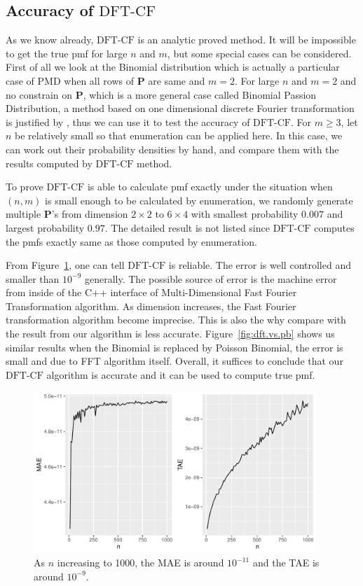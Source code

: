 \documentclass[12pt]{article}
\newcommand{\Pmat}{\mathbf{P}}
\newcommand{\PMD}{\textrm{PMD}}
\newcommand{\dft}{{\textrm{DFT-CF}}}
\begin{document}
\subsection{Accuracy of $\dft$}
As we know already, $\dft$ is an analytic proved method. It will be impossible to get the true pmf for large $n$ and $m$, but some special cases can be considered. First of all we look at the Binomial distribution which is actually a particular case of $\PMD$ when all rows of $\Pmat$ are same and $m=2$. For large $n$ and $m=2$ and no constrain on $\Pmat$, which is a more general case called Binomial Passion Distribution, a method based on one dimensional discrete Fourier transformation is justified by , thus we can use it to test the accuracy of $\dft$. For $m \geq 3$, let $n$ be relatively small so that enumeration can be applied here. In this case, we can work out their probability densities by hand, and compare them with the results computed by $\dft$ method.

To prove $\dft$ is able to calculate pmf exactly under the situation when $(n,m)$ is small enough to be calculated by enumeration, we randomly generate multiple $\Pmat$'s from dimension $2 \times 2$ to $6 \times 4$ with smallest probability $0.007$ and largest probability $0.97$. The detailed result is not listed since $\dft$ computes the pmfs exactly same as those computed by enumeration.

From Figure~\ref{fig:mae.tae}, one can tell $\dft$ is reliable. The error is well controlled and smaller than $10^{-9}$ generally. The possible source of error is the machine error from inside of the C++ interface of Multi-Dimensional Fast Fourier Transformation algorithm. As dimension increases, the Fast Fourier transformation algorithm become imprecise. This is also the why compare with the result from  our algorithm is less accurate. Figure~\ref{fig:dft.vs.pb} shows us similar results when the Binomial is replaced by Poisson Binomial, the error is small and due to FFT algorithm itself. Overall, it suffices to conclude that our $\dft$ algorithm is accurate and it can be used to compute true pmf.


\begin{figure}%
\begin{center}
\includegraphics[width=0.95\textwidth]{figures/binom.pdf}
\caption{As $n$ increasing to 1000, the MAE is around $10^{-11}$ and the TAE is around $10^{-9}$.} \label{fig:mae.tae}
\end{center}
\end{figure}
\end{document}

